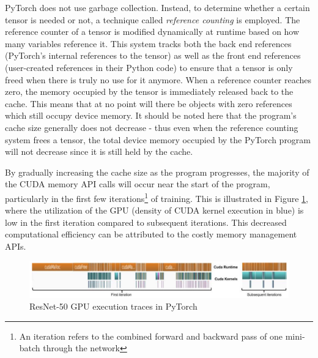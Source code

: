 \documentclass[12pt,letterpaper]{article}
\begin{document}
PyTorch does not use garbage collection. Instead, to determine whether a certain tensor is needed or not, a technique called \textit{reference counting} is employed. The reference counter of a tensor is modified dynamically at runtime based on how many variables reference it. This system tracks both the back end references (PyTorch's internal references to the tensor) as well as the front end references (user-created references in their Python code) to ensure that a tensor is only freed when there is truly no use for it anymore. When a reference counter reaches zero, the memory occupied by the tensor is immediately released back to the cache. This means that at no point will there be objects with zero references which still occupy device memory. It should be noted here that the program's cache size generally does not decrease - thus even when the reference counting system frees a tensor, the total device memory occupied by the PyTorch program will not decrease since it is still held by the cache.
\par 

By gradually increasing the cache size as the program progresses, the majority of the CUDA memory API calls will occur near the start of the program, particularly in the first few iterations\footnote{An iteration refers to the combined forward and backward pass of one mini-batch through the network} of training. This is illustrated in Figure \ref{fig:cuda_memory_kernels}, where the utilization of the GPU (density of CUDA kernel execution in blue) is low in the first iteration compared to subsequent iterations. This decreased computational efficiency can be attributed to the costly memory management APIs.
\begin{figure}[ht]
\centering
\includegraphics[width=.9\textwidth]{cuda_kernel_caching.png}
\captionsetup{width=0.7\linewidth}
\caption{ResNet-50 GPU execution traces in PyTorch \cite{pytorch_paper}}
\label{fig:cuda_memory_kernels}
\end{figure}

 
%
%
\end{document}
